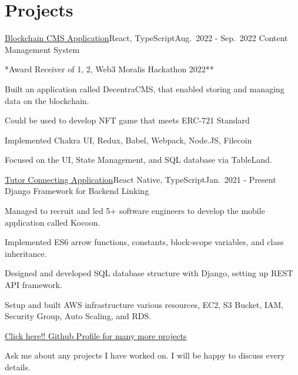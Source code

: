 \documentclass[10pt]{article}
\begin{document}
\spacedhrule{0.8ex}{0.0ex}
\vspace{-1ex}\section{Projects}\vspace{-0.5ex}\nopagebreak[4]


\headedsectionfour
{\href{https://632cf5989b5e1b01e4c6f25a--decentra-cms.netlify.app/}{Blockchain CMS Application}}{React, TypeScript}{{Aug.\ 2022 - Sep.\ 2022}}
{Content Management System}
{\vspace{-2.4ex}
    \begin{circlist}
			\item **Award Receiver of 1, 2, Web3 Moralis Hackathon 2022**
    	\item Built an application called DecentraCMS, that enabled storing and managing data on the blockchain.
      \item Could be used to develop NFT game that meets ERC-721 Standard
			\item Implemented Chakra UI, Redux, Babel, Webpack, Node.JS, Filecoin
			\item Focused on the UI, State Management, and SQL database via TableLand.
    \end{circlist}
}


\headedsectionfour
{\href{https://github.com/JimSongTheGreatest/Kocoon}{Tutor Connecting Application}}{React Native, TypeScript}{{Jan.\ 2021 - Present}}
{Django Framework for Backend Linking}
{\vspace{-2.4ex}
    \begin{circlist}
			\item Managed to recruit and led 5+ software engineers to develop the mobile application called Kocoon.
			\item Implemented ES6 arrow functions, constants, block-scope variables, and class inheritance.
			\item Designed and developed SQL database structure with Django, setting up REST API framework.
			\item Setup and built AWS infrastructure various resources, EC2, S3 Bucket, IAM, Security Group, Auto Scaling, and RDS.
    \end{circlist}
}

\headedsectionfour
{\href{https://github.com/JimSongTheGreatest}{Click here!! Github Profile for many more projects}}{}
{}
{\vspace{-2.4ex}
    \begin{circlist}
			\item Ask me about any projects I have worked on. I will be happy to discuss every details.
    \end{circlist}
	\vspace{-4ex}
}
\end{document}
